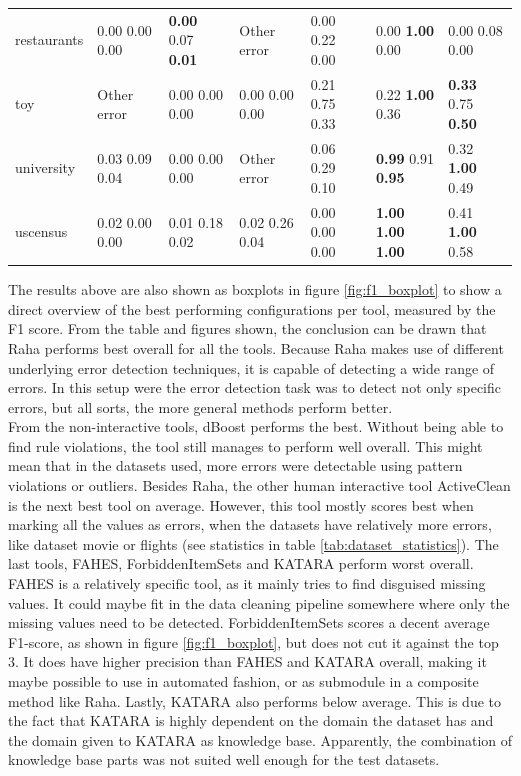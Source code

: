 \begin{table}[H]
\begin{adjustbox}{center}
\begin{tabular}{lllllll}
restaurants & 0.00 0.00 0.00 & \textbf{0.00} 0.07 \textbf{0.01} & Other error & 0.00 0.22 0.00 & 0.00 \textbf{1.00} 0.00 & 0.00 0.08 0.00 \\
toy & Other error & 0.00 0.00 0.00 & 0.00 0.00 0.00 & 0.21 0.75 0.33 & 0.22 \textbf{1.00} 0.36 & \textbf{0.33} 0.75 \textbf{0.50} \\
university & 0.03 0.09 0.04 & 0.00 0.00 0.00 & Other error & 0.06 0.29 0.10 & \textbf{0.99} 0.91 \textbf{0.95} & 0.32 \textbf{1.00} 0.49 \\
uscensus & 0.02 0.00 0.00 & 0.01 0.18 0.02 & 0.02 0.26 0.04 & 0.00 0.00 0.00 & \textbf{1.00} \textbf{1.00} \textbf{1.00} & 0.41 \textbf{1.00} 0.58 \\
\bottomrule
\end{tabular}
\end{adjustbox}
\end{table}

The results above are also shown as boxplots in figure \ref{fig:f1_boxplot} to show a direct overview of the best performing configurations per tool, measured by the F1 score. From the table and figures shown, the conclusion can be drawn that Raha performs best overall for all the tools. Because Raha makes use of different underlying error detection techniques, it is capable of detecting a wide range of errors. In this setup were the error detection task was to detect not only specific errors, but all sorts, the more general methods perform better.
\\From the non-interactive tools, dBoost performs the best. Without being able to find rule violations, the tool still manages to perform well overall. This might mean that in the datasets used, more errors were detectable using pattern violations or outliers. 
Besides Raha, the other human interactive tool ActiveClean is the next best tool on average. However, this tool mostly scores best when marking all the values as errors, when the datasets have relatively more errors, like dataset movie or flights (see statistics in table \ref{tab:dataset_statistics}). The last tools, FAHES, ForbiddenItemSets and KATARA perform worst overall. FAHES is a relatively specific tool, as it mainly tries to find disguised missing values. It could maybe fit in the data cleaning pipeline somewhere where only the missing values need to be detected. ForbiddenItemSets scores a decent average F1-score, as shown in figure \ref{fig:f1_boxplot}, but does not cut it against the top 3. It does have higher precision than FAHES and KATARA overall, making it maybe possible to use in automated fashion, or as submodule in a composite method like Raha. Lastly, KATARA also performs below average. This is due to the fact that KATARA is highly dependent on the domain the dataset has and the domain given to KATARA as knowledge base. Apparently, the combination of knowledge base parts was not suited well enough for the test datasets.

